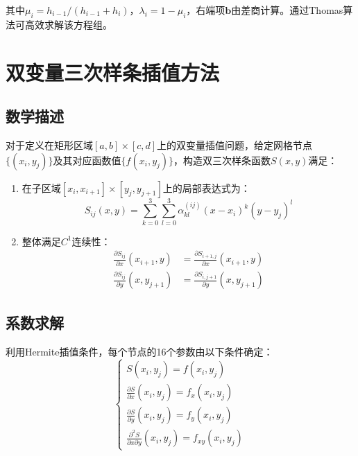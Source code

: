 其中$\mu_i = h_{i-1}/(h_{i-1}+h_i)$，$\lambda_i = 1-\mu_i$，右端项$\mathbf{b}$由差商计算。通过Thomas算法可高效求解该方程组。

\section{双变量三次样条插值方法}
\subsection{数学描述}
对于定义在矩形区域$[a,b]\times[c,d]$上的双变量插值问题，给定网格节点$\{(x_i,y_j)\}$及其对应函数值$\{f(x_i,y_j)\}$，构造双三次样条函数$S(x,y)$满足：

\begin{enumerate}
    \item 在子区域$[x_i,x_{i+1}]\times[y_j,y_{j+1}]$上的局部表达式为：
    \begin{equation}
        S_{ij}(x,y) = \sum_{k=0}^3\sum_{l=0}^3 \alpha_{kl}^{(ij)}(x-x_i)^k(y-y_j)^l
    \end{equation}
    
    \item 整体满足$C^1$连续性：
    \begin{align}
        \frac{\partial S_{ij}}{\partial x}(x_{i+1},y) &= \frac{\partial S_{i+1,j}}{\partial x}(x_{i+1},y) \\
        \frac{\partial S_{ij}}{\partial y}(x,y_{j+1}) &= \frac{\partial S_{i,j+1}}{\partial y}(x,y_{j+1})
    \end{align}
\end{enumerate}

\subsection{系数求解}
利用Hermite插值条件，每个节点的16个参数由以下条件确定：
\begin{equation}
    \begin{cases}
        S(x_i,y_j) = f(x_i,y_j) \\
        \frac{\partial S}{\partial x}(x_i,y_j) = f_x(x_i,y_j) \\
        \frac{\partial S}{\partial y}(x_i,y_j) = f_y(x_i,y_j) \\
        \frac{\partial^2 S}{\partial x\partial y}(x_i,y_j) = f_{xy}(x_i,y_j)
    \end{cases}
\end{equation}


